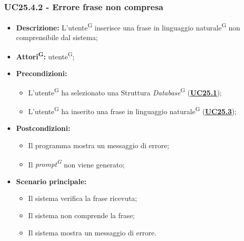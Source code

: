\subsubsection{UC25.4.2 - Errore frase non compresa}
\label{sec:UC25.4.2}
\begin{itemize}
	\item \textbf{Descrizione:} L’utente\textsuperscript{G} inserisce una frase in linguaggio naturale\textsuperscript{G} non comprensibile dal sistema;
	\item \textbf{Attori\textsuperscript{G}:} utente\textsuperscript{G};
	\item \textbf{Precondizioni:} 
	\begin{itemize}
			\item L’utente\textsuperscript{G} ha selezionato una Struttura \textit{Database}\textsuperscript{G} (\hyperref[sec:UC25.1]{\textbf{UC25.1}});
		\item L'utente\textsuperscript{G} ha inserito una frase in linguaggio naturale\textsuperscript{G} (\hyperref[sec:UC25.3]{\textbf{UC25.3}});
	\end{itemize}
	\item \textbf{Postcondizioni:} 
	\begin{itemize}
		\item Il programma mostra un messaggio di errore;
		\item Il \textit{prompt\textsuperscript{G}} non viene generato;
	\end{itemize}
	\item \textbf{Scenario principale:} 
	\begin{itemize}
		\item Il sistema verifica la frase ricevuta;
		\item Il sistema non comprende la frase;
		\item Il sistema mostra un messaggio di errore.
	\end{itemize}
\end{itemize}


